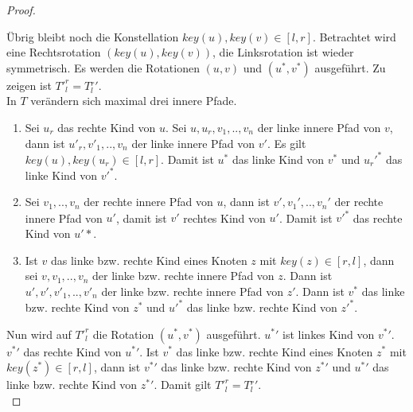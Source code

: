 \documentclass[a4paper,12pt]{article}
\begin{document}
\begin{proof}
\begin{enumerate}
\end{enumerate}	
\noindent Übrig bleibt noch die Konstellation $\mathit{key}\left(u\right),\mathit{key}(v) \in \left[l,r\right]$. 
Betrachtet wird eine Rechtsrotation $\left(\mathit{key}\left(u\right),\mathit{key}\left(v\right)\right)$, die Linksrotation ist wieder symmetrisch. 
Es werden die Rotationen $\left(u,v \right)$ und $\left(u^*,v^* \right)$ ausgeführt.
Zu zeigen ist ${T'}^r_l = T{^r_l}' $.\\
In $T$ verändern sich maximal drei innere Pfade.
\begin{enumerate}
	\item Sei $u_r$ das rechte Kind von $u$. Sei $u,u_r,v_1,..,v_n$ der linke innere Pfad von $v$, dann ist $u'_r,v'_1,..,v_n$ der linke innere Pfad von $v'$. Es gilt ${\mathit{key}(u), \mathit{key}(u_r) \in \left[l,r\right] }$. Damit ist $u^*$ das linke Kind von $v^*$ und ${u_r}'^*$ das linke Kind von $v'^*$.
	\item Sei $v_1,..,v_n$ der rechte innere Pfad von $u$, dann ist $v',v_1',..,v_n'$ der rechte innere Pfad von $u'$, damit ist $v'$ rechtes Kind von $u'$. Damit ist $v'^*$ das rechte Kind von $u'*$.
	\item Ist $v$ das linke bzw. rechte Kind eines Knoten $z$ mit $\mathit{key}(z) \in \left[r,l\right]$, dann sei  $v,v_1,..,v_n$ der linke bzw. rechte innere Pfad von $z$. Dann ist  $u',v',v'_1,..,v'_n$ der linke bzw. rechte innere Pfad von $z'$. Dann ist  $v^*$ das linke bzw. rechte Kind von $z^*$ und $u'^*$ das linke bzw. rechte Kind von $z'^*$.
\end{enumerate}
 \noindent Nun wird auf ${T'}^r_l$ die Rotation $(u^*,v^*)$ ausgeführt. $u{^*}'$ ist linkes Kind von $v{^*}'$. $v{^*}'$ das rechte Kind von $u{^*}'$. Ist $v^*$ das linke bzw. rechte Kind eines Knoten $z^*$ mit  $\mathit{key}(z^*) \in \left[r,l\right]$, dann ist $v{^*}'$ das linke bzw. rechte Kind von $z{^*}'$ und $u{^*}'$ das linke bzw. rechte Kind von $z{^*}'$. Damit gilt ${T'}^r_l = T{^r_l}'$.\\
 	
\end{proof}
    
\end{document}
